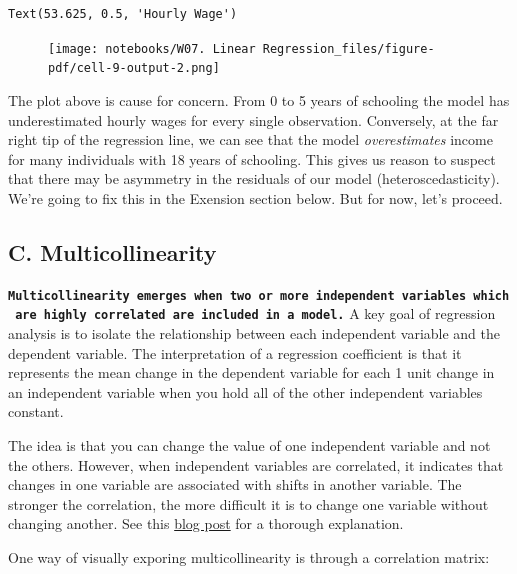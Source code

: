 \documentclass[
  letterpaper,
  DIV=11,
  numbers=noendperiod]{scrreprt}
\begin{document}
\begin{verbatim}
Text(53.625, 0.5, 'Hourly Wage')
\end{verbatim}

\begin{figure}[H]

{\centering \texttt{[image: notebooks/W07. Linear Regression\_files/figure-pdf/cell-9-output-2.png]}

}

\end{figure}

The plot above is cause for concern. From 0 to 5 years of schooling the
model has underestimated hourly wages for every single observation.
Conversely, at the far right tip of the regression line, we can see that
the model \emph{overestimates} income for many individuals with 18 years
of schooling. This gives us reason to suspect that there may be
asymmetry in the residuals of our model (heteroscedasticity). We're
going to fix this in the Exension section below. But for now, let's
proceed.

\hypertarget{c.-multicollinearity}{%
\subsection{C. Multicollinearity}\label{c.-multicollinearity}}

\textbf{\texttt{Multicollinearity\ emerges\ when\ two\ or\ more\ independent\ variables\ which\ are\ highly\ correlated\ are\ included\ in\ a\ model.}}
A key goal of regression analysis is to isolate the relationship between
each independent variable and the dependent variable. The interpretation
of a regression coefficient is that it represents the mean change in the
dependent variable for each 1 unit change in an independent variable
when you hold all of the other independent variables constant.

The idea is that you can change the value of one independent variable
and not the others. However, when independent variables are correlated,
it indicates that changes in one variable are associated with shifts in
another variable. The stronger the correlation, the more difficult it is
to change one variable without changing another. See this
\href{https://statisticsbyjim.com/regression/multicollinearity-in-regression-analysis/}{blog
post} for a thorough explanation.

One way of visually exporing multicollinearity is through a correlation
matrix:
\end{document}

